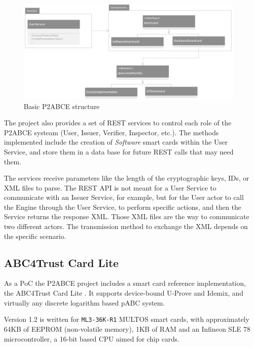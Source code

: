 \begin{figure}[bth]
	\begin{center}
		\includegraphics[width=\linewidth]{gfx/UML/p2abceBasicUML}
	\end{center}
	\caption{Basic P2ABCE structure}
	\label{fig:p2abceBasicUML}
\end{figure}


\hfil

The project also provides a set of REST services to control each role of the P2ABCE systeam (User, Issuer, Verifier, Inspector, etc.). The methods implemented include the creation of \textit{Software} smart cards within the User Service, and store them in a data base for future REST calls that may need them.

The services receive parameters like the length of the cryptographic keys, IDs, or XML files to parse. The REST API is not meant for a User Service to communicate with an Issuer Service, for example, but for the User actor to call the Engine through the User Service, to perform specific actions, and then the Service returns the response XML. Those XML files are the way to communicate two different actors. The transmission method to exchange the XML depends on the specific scenario.



\subsection{ABC4Trust Card Lite}

As a PoC the P2ABCE project includes a smart card reference implementation, the ABC4Trust Card Lite \citep{ABC4TCardLite}. It supports device-bound U-Prove and Idemix, and virtually any discrete logarithm based pABC system.

Version 1.2 is written for \texttt{ML3-36K-R1} MULTOS smart cards, with approximately 64KB of EEPROM (non-volatile memory), 1KB of RAM and an Infineon SLE 78 microcontroller, a 16-bit based CPU aimed for chip cards.

